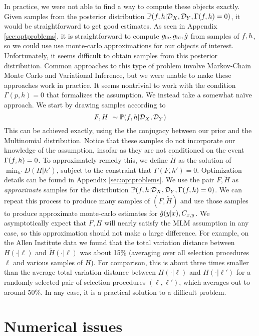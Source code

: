 In practice, we were not able to find a way to compute these objects exactly.  Given samples from the posterior distribution $\mathbb{P}(f,h| {\mathcal{D}_X},{\mathcal{D}_Y},\Gamma(f,h)=0)$, it would be straightforward to get good estimates.  As seen in Appendix \ref{sec:optproblems}, it is straightforward to compute $g_{\mathrm{lo}},g_{\mathrm{hi}},\hat {g}$ from samples of $f,h$, so we could use use monte-carlo approximations for our objects of interest.  Unfortunately, it seems difficult to obtain samples from this posterior distribution.   Common approaches to this type of problem involve Markov-Chain Monte Carlo and Variational Inference, but we were unable to make these approaches work in practice.  It seems nontrivial to work with the condition $\Gamma(p,h)=0$ that formalizes the \MLM{} assumption.  We instead take a somewhat na\"ive approach.  We start by drawing samples according to
\[
F,H ~ \sim \mathbb{P}(f,h | {\mathcal{D}_X},{\mathcal{D}_Y})
\]
This can be achieved exactly, using the the conjugacy between our prior and the Multinomial distribution.  Notice that these samples do not incorporate our knowledge of the \MLM{} assumption, insofar as they are not conditioned on the event $\Gamma(f,h)=0$.  To approximately remedy this, we define $\tilde H$ as the solution of $\min_{h'}D(H|h')$, subject to the constraint that $\Gamma(F,h')=0$.  Optimization details can be found in Appendix \ref{sec:optproblems}.  We use the pair $F,\tilde H$ as \emph{approximate} samples for the distribution $\mathbb{P}(f,h| {\mathcal{D}_X},{\mathcal{D}_Y},\Gamma(f,h)=0)$.  We can repeat this process to produce many samples of $(F,\tilde H)$ and use those samples to produce approximate monte-carlo estimates for $\hat {g}(y|x),C_{x,y}$.  We asymptotically expect that $F,H$ will nearly satisfy the MLM assumption in any case, so this approximation should not make a large difference.  For example, on the Allen Institute data we found that the total variation distance between $H(\cdot|\ell)$ and $\tilde H(\cdot|\ell)$ was about 15\% (averaging over all selection procedures $\ell$ and various samples of $H$).  For comparison, this is about three times smaller than the average total variation distance between $H(\cdot|\ell)$ and $H(\cdot|\ell')$ for a randomly selected pair of selection procedures $(\ell,\ell')$, which averages out to around 50\%.   In any case, it is a practical solution to a difficult problem.

\section{Numerical issues}

